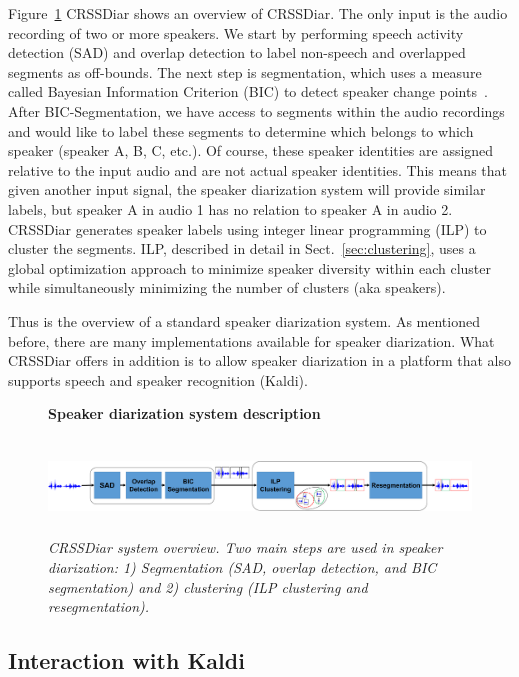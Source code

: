 Figure~\ref{fig:crssdiar} CRSSDiar shows an overview of CRSSDiar. 
The only input is the audio recording of two or more speakers. 
We start by performing speech activity detection (SAD) and overlap detection to label non-speech and overlapped segments as off-bounds. 
The next step is segmentation, which uses a measure called Bayesian Information Criterion (BIC) to detect speaker change points~\cite{chen1998BIC}. 
After BIC-Segmentation, we have access to segments within the audio recordings and would like to label these segments to determine which belongs to which speaker (speaker A, B, C, etc.). 
Of course, these speaker identities are assigned relative to the input audio and are not actual speaker identities. 
This means that given another input signal, the speaker diarization system will provide similar labels, but speaker A in audio 1 has no relation to speaker A in audio 2. 
CRSSDiar generates speaker labels using integer linear programming (ILP) to cluster the segments. 
ILP, described in detail in Sect.~\ref{sec:clustering}, uses a global optimization approach to minimize speaker diversity within each cluster while simultaneously minimizing the number of clusters (aka speakers). 

Thus is the overview of a standard speaker diarization system. 
As mentioned before, there are many implementations available for speaker diarization. 
What CRSSDiar offers in addition is to allow speaker diarization in a platform that also supports speech and speaker recognition (Kaldi). 


\begin{figure}[t!]
	\centering
	\textbf{Speaker diarization system description}\par\medskip
	\includegraphics[height = 1in, width=1\textwidth]{figures/crssdiar_outline}
	\caption{\it \small CRSSDiar system overview. Two main steps are used in speaker diarization: 1) Segmentation (SAD, overlap detection, and BIC segmentation) and 2) clustering (ILP clustering and resegmentation). }
	\label{fig:crssdiar}
	\vspace{-3mm}
\end{figure}

\subsection{Interaction with Kaldi}
\label{ssec:crssdiar_and_kaldi}

